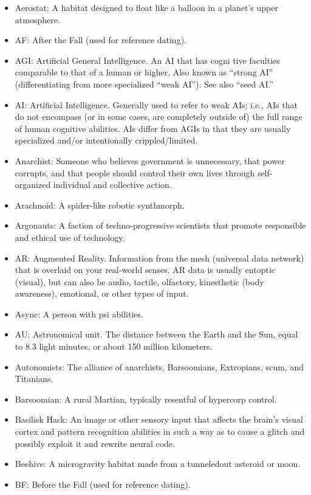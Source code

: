\begin{itemize}
\item Aerostat: A habitat designed to float like a balloon in a
  planet's upper atmosphere.
\item AF: After the Fall (used for reference dating).
\item AGI: Artificial General Intelligence. An AI that has cogni tive
  faculties comparable to that of a human or higher.  Also known as
  ``strong AI'' (differentiating from more specialized ``weak AI''). See
  also ``seed AI.''
\item AI: Artificial Intelligence. Generally used to refer to weak
  AIs; i.e., AIs that do not encompass (or in some cases, are
  completely outside of) the full range of human cognitive
  abilities. AIs differ from AGIs in that they are usually specialized
  and/or intentionally crippled/limited.
\item Anarchist: Someone who believes government is unnecessary, that
  power corrupts, and that people should control their own lives
  through self-organized individual and collective action.
\item Arachnoid: A spider-like robotic synthmorph.
\item Argonauts: A faction of techno-progressive scientists that
  promote responsible and ethical use of technology.
\item AR: Augmented Reality. Information from the mesh (universal data
  network) that is overlaid on your real-world senses. AR data is
  usually entoptic (visual), but can also be audio, tactile,
  olfactory, kinesthetic (body awareness), emotional, or other types
  of input.
\item Async: A person with psi abilities.
\item AU: Astronomical unit. The distance between the Earth and the
  Sun, equal to 8.3 light minutes, or about 150 million kilometers.
\item Autonomists: The alliance of anarchists, Barsoomians,
  Extropians, scum, and Titanians.
\item Barsoomian: A rural Martian, typically resentful of hypercorp
  control.
\item Basilisk Hack: An image or other sensory input that affects the
  brain's visual cortex and pattern recognition abilities in such a
  way as to cause a glitch and possibly exploit it and rewrite neural
  code.
\item Beehive: A microgravity habitat made from a tunneledout asteroid
  or moon.
\item BF: Before the Fall (used for reference dating).

\end{itemize}
